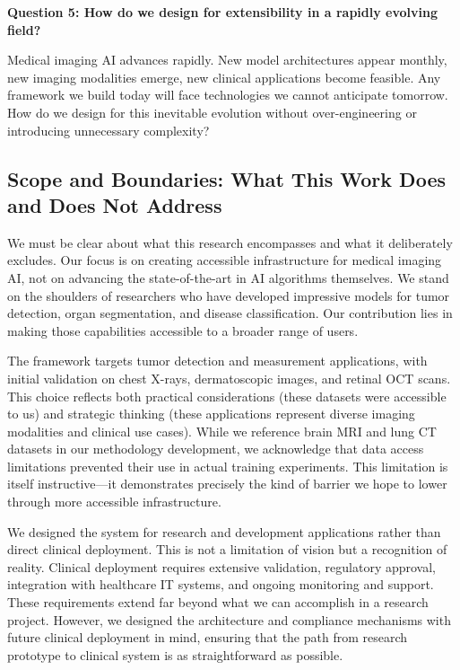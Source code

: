 \documentclass[12pt,a4paper]{article}
\begin{document}
\textbf{Question 5: How do we design for extensibility in a rapidly evolving field?}

Medical imaging AI advances rapidly. New model architectures appear monthly, new imaging modalities emerge, new clinical applications become feasible. Any framework we build today will face technologies we cannot anticipate tomorrow. How do we design for this inevitable evolution without over-engineering or introducing unnecessary complexity?

\subsection{Scope and Boundaries: What This Work Does and Does Not Address}

We must be clear about what this research encompasses and what it deliberately excludes. Our focus is on creating accessible infrastructure for medical imaging AI, not on advancing the state-of-the-art in AI algorithms themselves. We stand on the shoulders of researchers who have developed impressive models for tumor detection, organ segmentation, and disease classification. Our contribution lies in making those capabilities accessible to a broader range of users.

The framework targets tumor detection and measurement applications, with initial validation on chest X-rays, dermatoscopic images, and retinal OCT scans. This choice reflects both practical considerations (these datasets were accessible to us) and strategic thinking (these applications represent diverse imaging modalities and clinical use cases). While we reference brain MRI and lung CT datasets in our methodology development, we acknowledge that data access limitations prevented their use in actual training experiments. This limitation is itself instructive—it demonstrates precisely the kind of barrier we hope to lower through more accessible infrastructure.

We designed the system for research and development applications rather than direct clinical deployment. This is not a limitation of vision but a recognition of reality. Clinical deployment requires extensive validation, regulatory approval, integration with healthcare IT systems, and ongoing monitoring and support. These requirements extend far beyond what we can accomplish in a research project. However, we designed the architecture and compliance mechanisms with future clinical deployment in mind, ensuring that the path from research prototype to clinical system is as straightforward as possible.
\end{document}
